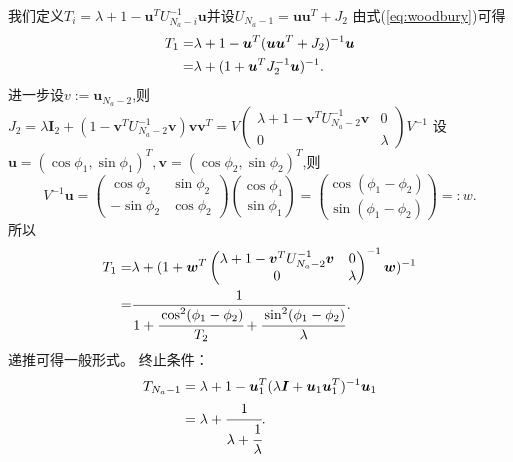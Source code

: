我们定义$T_i=\lambda+1-\bm{u}^T U_{N_a-i}^{-1}\bm{u}$并设$U_{N_a-1}=\bm{u}\bm{u}^T+J_2$
由式(\ref{eq:woodbury})可得
\begin{align}\notag
T_1=&\lambda+1-\bm{u}^T (\bm{u}\bm{u}^T+J_2)^{-1}\bm{u}\\
=&\lambda+(1+\bm{u}^T J_2^{-1}\bm{u})^{-1}.
\end{align}
进一步设$v:=\bm{u}_{N_a-2}$,则$J_2=\lambda \bm{I}_2+(1-\bm{v}^T U_{N_a-2}^{-1}\bm{v})\bm{v}\bm{v}^T=V\begin{pmatrix}
                     \lambda+1-\bm{v}^T U_{N_a-2}^{-1}\bm{v} & 0 \\
                     0 & \lambda
                   \end{pmatrix}V^{-1}$
设$\bm{u}=(\cos\phi_1,\sin\phi_1)^T,\bm{v}=(\cos\phi_2,\sin\phi_2)^T$,则
\begin{equation}
V^{-1}\bm{u}=\begin{pmatrix}
                     \cos\phi_2 & \sin\phi_2 \\
                     -\sin\phi_2 & \cos\phi_2
                   \end{pmatrix}\binom{\cos\phi_1}{\sin\phi_1}=\binom{\cos(\phi_1-\phi_2)}{\sin(\phi_1-\phi_2)}=:w.
\end{equation}
所以
\begin{align*}
T_1=&\lambda+(1+\bm{w}^T \begin{pmatrix}
                     \lambda+1-\bm{v}^T U_{N_a-2}^{-1}\bm{v} & 0 \\
                     0 & \lambda
                   \end{pmatrix}^{-1}\bm{w})^{-1}\\
                   =&\frac{1}{1+\cfrac{\cos^2(\phi_1-\phi_2)}{T_2}+\cfrac{\sin^2(\phi_1-\phi_2)}{\lambda}}.
\end{align*}
递推可得一般形式。
终止条件：
\begin{align*}
T_{N_a-1}&=\lambda+1-\bm{u}_1^T(\lambda\bm{I}+\bm{u}_1\bm{u}_1^T)^{-1}\bm{u}_1\\
&=\lambda+\cfrac{1}{\lambda+\cfrac{1}{\lambda}}.
\end{align*}
